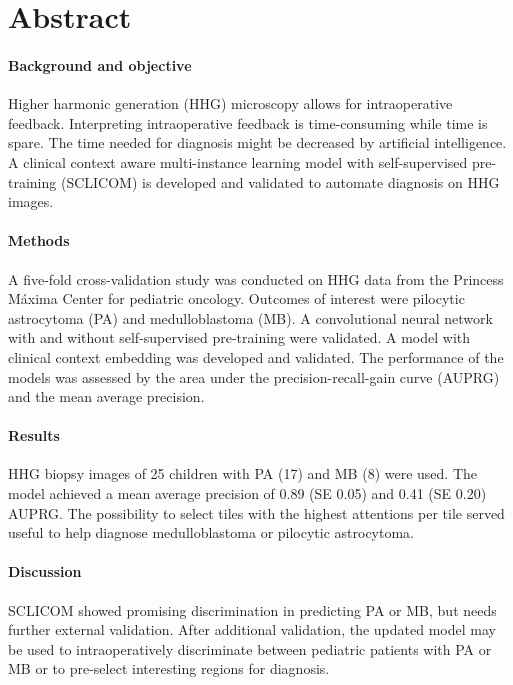 \section*{Abstract}

\paragraph{Background and objective}
Higher harmonic generation (HHG) microscopy allows for intraoperative feedback.
Interpreting intraoperative feedback is time-consuming while time is spare.
The time needed for diagnosis might be decreased by artificial intelligence.
A clinical context aware multi-instance learning model with self-supervised pre-training (SCLICOM) is developed and validated to automate diagnosis on HHG images.

\paragraph{Methods}
A five-fold cross-validation study was conducted on HHG data from the Princess Máxima Center for pediatric oncology.
Outcomes of interest were pilocytic astrocytoma (PA) and medulloblastoma (MB).
A convolutional neural network with and without self-supervised pre-training were validated.
A model with clinical context embedding was developed and validated.
The performance of the models was assessed by the area under the precision-recall-gain curve (AUPRG) and the mean average precision.

\paragraph{Results}
HHG biopsy images of 25 children with PA (17) and MB (8) were used.
The model achieved a mean average precision of \num{0.89} (SE \num{0.05}) and \num{0.41} (SE \num{0.20}) AUPRG.
The possibility to select tiles with the highest attentions per tile served useful to help diagnose medulloblastoma or pilocytic astrocytoma.

\paragraph{Discussion}
SCLICOM showed promising discrimination in predicting PA or MB, but needs further external validation.
After additional validation, the updated model may be used to intraoperatively discriminate between pediatric patients with PA or MB or to pre-select interesting regions for diagnosis.
